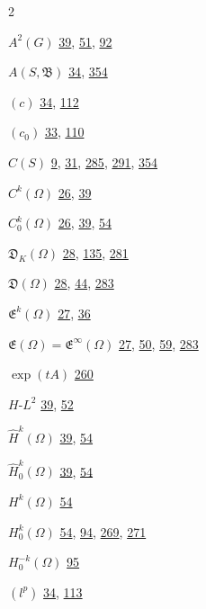 \begin{multicols}{2}\raggedcolumns\footnotesize\raggedright\setlength{\parindent}{0pt}\setlength{\parskip}{0pt}
\noindent $ A^{2}(G) $ \hyperlink{page.39}{39}, \hyperlink{page.51}{51}, \hyperlink{page.92}{92}\par
\noindent $A(S, \mathfrak{B})$ \hyperlink{page.34}{34}, \hyperlink{page.354}{354}\par
\noindent $(c)$ \hyperlink{page.34}{34}, \hyperlink{page.112}{112}\par
\noindent $ (c_{0}) $ \hyperlink{page.33}{33}, \hyperlink{page.110}{110}\par
\noindent $C(S)$ \hyperlink{page.9}{9}, \hyperlink{page.31}{31}, \hyperlink{page.285}{285}, \hyperlink{page.291}{291}, \hyperlink{page.354}{354}\par
\noindent $ C^{k}(\Omega) $ \hyperlink{page.26}{26}, \hyperlink{page.39}{39}\par
\noindent $ C_0^k(\Omega) $ \hyperlink{page.26}{26}, \hyperlink{page.39}{39}, \hyperlink{page.54}{54}\par
\noindent $ \mathfrak{D}_{K}(\Omega) $ \hyperlink{page.28}{28}, \hyperlink{page.135}{135}, \hyperlink{page.281}{281}\par
\noindent $ \mathfrak{D}(\Omega) $ \hyperlink{page.28}{28}, \hyperlink{page.44}{44}, \hyperlink{page.283}{283}\par
\noindent $ \mathfrak{E}^{k}(\Omega) $ \hyperlink{page.27}{27}, \hyperlink{page.36}{36}\par
\noindent $ \mathfrak{E}(\Omega) = \mathfrak{E}^\infty(\Omega) $ \hyperlink{page.27}{27}, \hyperlink{page.50}{50}, \hyperlink{page.59}{59}, \hyperlink{page.283}{283}\par
\noindent $\exp(tA)$ \hyperlink{page.260}{260}\par
\noindent $H$-$L^{2}$ \hyperlink{page.39}{39}, \hyperlink{page.52}{52}\par
\noindent $ \hat{H}^{k}(\Omega) $ \hyperlink{page.39}{39}, \hyperlink{page.54}{54}\par
\noindent $ \hat{H}_0^k(\Omega) $ \hyperlink{page.39}{39}, \hyperlink{page.54}{54}\par
\noindent $ H^k(\Omega) $ \hyperlink{page.54}{54}\par
\noindent $ H_0^k(\Omega) $ \hyperlink{page.54}{54}, \hyperlink{page.94}{94}, \hyperlink{page.269}{269}, \hyperlink{page.271}{271}\par
\noindent $ H_0^{-k}(\Omega) $ \hyperlink{page.95}{95}\par
\hspace*{1.1em}$(l^{p})$ \hyperlink{page.34}{34}, \hyperlink{page.113}{113}\par

\end{multicols}
